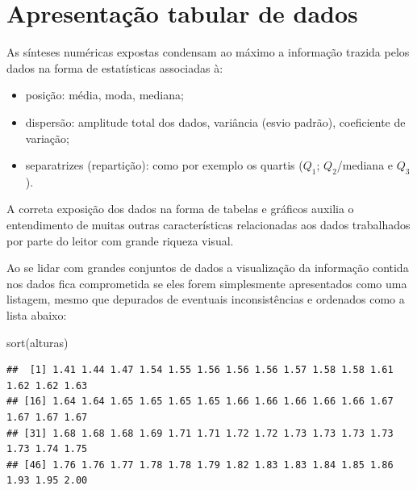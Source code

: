 \documentclass[
]{book}
\newenvironment{Shaded}{\begin{snugshade}}{\end{snugshade}}
\newcommand{\FunctionTok}[1]{\textcolor[rgb]{0.00,0.00,0.00}{#1}}
\newcommand{\NormalTok}[1]{#1}
\providecommand{\tightlist}{%
  \setlength{\itemsep}{0pt}\setlength{\parskip}{0pt}}
\begin{document}
\hypertarget{apresentauxe7uxe3o-tabular-de-dados}{%
\section{Apresentação tabular de dados}\label{apresentauxe7uxe3o-tabular-de-dados}}

\hfill\break

As sínteses numéricas expostas condensam ao máximo a informação trazida pelos dados na forma de estatísticas associadas à:

\hfill\break

\begin{itemize}
\tightlist
\item
  posição: média, moda, mediana;
\item
  dispersão: amplitude total dos dados, variância (esvio padrão), coeficiente de variação;
\item
  separatrizes (repartição): como por exemplo os quartis (\(Q_{1}\); \(Q_{2}\)/mediana e \(Q_{3}\)).
\end{itemize}

\hfill\break

A correta exposição dos dados na forma de tabelas e gráficos auxilia o entendimento de muitas outras características relacionadas aos dados trabalhados por parte do leitor com grande riqueza visual.

\hfill\break

Ao se lidar com grandes conjuntos de dados a visualização da informação contida nos dados fica comprometida se eles forem simplesmente apresentados como uma listagem, mesmo que depurados de eventuais inconsistências e ordenados como a lista abaixo:

\hfill\break

\begin{Shaded}
\begin{Highlighting}[]
\FunctionTok{sort}\NormalTok{(alturas)}
\end{Highlighting}
\end{Shaded}

\begin{verbatim}
##  [1] 1.41 1.44 1.47 1.54 1.55 1.56 1.56 1.56 1.57 1.58 1.58 1.61 1.62 1.62 1.63
## [16] 1.64 1.64 1.65 1.65 1.65 1.65 1.66 1.66 1.66 1.66 1.66 1.67 1.67 1.67 1.67
## [31] 1.68 1.68 1.68 1.69 1.71 1.71 1.72 1.72 1.73 1.73 1.73 1.73 1.73 1.74 1.75
## [46] 1.76 1.76 1.77 1.78 1.78 1.79 1.82 1.83 1.83 1.84 1.85 1.86 1.93 1.95 2.00
\end{verbatim}
\end{document}
